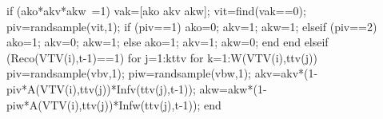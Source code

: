                                                                if (ako*akv*akw~=1)                                                                
                                                                       vak=[ako akv akw];
                                                                       vit=find(vak==0); 
                                                                       piv=randsample(vit,1);
                                                                       if (piv==1)
                                                                            ako=0;
                                                                            akv=1;
                                                                            akw=1;
                                                                       elseif (piv==2)
                                                                            ako=1;
                                                                            akv=0;
                                                                            akw=1;
                                                                       else 
                                                                            ako=1;
                                                                            akv=1;
                                                                            akw=0;
                                                                       end                                                                       
                                                                end
                                          elseif (Reco(VTV(i),t-1)==1)
                                                    for j=1:kttv                                                                                                  
                                                          for k=1:W(VTV(i),ttv(j))                                                               
                                                                piv=randsample(vbv,1);
                                                                piw=randsample(vbw,1);
                                                                akv=akv*(1-piv*A(VTV(i),ttv(j))*Infv(ttv(j),t-1));
                                                                akw=akw*(1-piw*A(VTV(i),ttv(j))*Infw(ttv(j),t-1));                                                                 
                                                          end                                                                                                                   
                                                          
